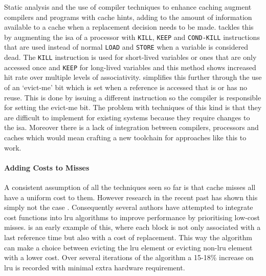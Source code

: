 Static analysis and the use of compiler techniques to enhance caching augment compilers and programs with cache hints, adding to the amount of information available to a cache when a replacement decision needs to be made. \citet{jainSoftwareassistedCacheReplacement2001} tackles this by augmenting the \gls{isa} of a processor with \texttt{KILL}, \texttt{KEEP} and \texttt{COND-KILL} instructions that are used instead of normal \texttt{LOAD} and \texttt{STORE} when a variable is considered dead. The \texttt{KILL} instruction is used for short-lived variables or ones that are only accessed once and \texttt{KEEP} for long-lived variables and this method shows increased hit rate over multiple levels of associativity. \citet{wangUsingCompilerImprove2002} simplifies this further through the use of an `evict-me' bit which is set when a reference is accessed that is  or has no reuse. This is done by issuing a different instruction so the compiler is responsible for setting the evict-me bit. The problem with techniques of this kind is that they are difficult to implement for existing systems because they require changes to the \gls{isa}. Moreover there is a lack of integration between compilers, processors and caches which would mean crafting a new toolchain for approaches like this to work. 

\paragraph{Adding Costs to Misses}

A consistent assumption of all the techniques seen so far is that cache misses all have a uniform cost to them. However research in the recent past has shown this simply not the case \cite{qureshiCaseMLPAwareCache2006}. Consequently several authors have attempted to integrate cost functions into \gls{lru} algorithms to improve performance by prioritising low-cost misses. \citet{jeongCostsensitiveCacheReplacement2003} is an early example of this, where each block is not only associated with a last reference time but also with a cost of replacement. This way the algorithm can make a choice between evicting the \gls{lru} element or evicting non-\gls{lru} element with a lower cost. Over several iterations of the algorithm a 15-18\% increase on \gls{lru} is recorded with minimal extra hardware requirement. 

